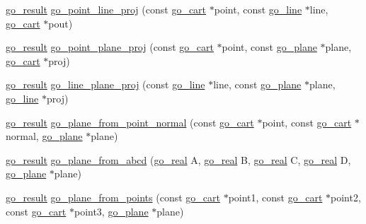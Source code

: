 \begin{DoxyCompactItemize}
\item 
\hyperlink{gotypes_8h_a55d48b38cd959f63c7e8db8337a9792a}{go\-\_\-result} \hyperlink{namespacegomotion_a36bd2c5167f64cc51da6bdf3dbdb4116}{go\-\_\-point\-\_\-line\-\_\-proj} (const \hyperlink{structgomotion_1_1go__cart}{go\-\_\-cart} $\ast$point, const \hyperlink{structgomotion_1_1go__line}{go\-\_\-line} $\ast$line, \hyperlink{structgomotion_1_1go__cart}{go\-\_\-cart} $\ast$pout)
\item 
\hyperlink{gotypes_8h_a55d48b38cd959f63c7e8db8337a9792a}{go\-\_\-result} \hyperlink{namespacegomotion_a79d749aa4142b2ee2e135f46a6656f21}{go\-\_\-point\-\_\-plane\-\_\-proj} (const \hyperlink{structgomotion_1_1go__cart}{go\-\_\-cart} $\ast$point, const \hyperlink{structgomotion_1_1go__plane}{go\-\_\-plane} $\ast$plane, \hyperlink{structgomotion_1_1go__cart}{go\-\_\-cart} $\ast$proj)
\item 
\hyperlink{gotypes_8h_a55d48b38cd959f63c7e8db8337a9792a}{go\-\_\-result} \hyperlink{namespacegomotion_a120a912e2b439a904744d980b62867aa}{go\-\_\-line\-\_\-plane\-\_\-proj} (const \hyperlink{structgomotion_1_1go__line}{go\-\_\-line} $\ast$line, const \hyperlink{structgomotion_1_1go__plane}{go\-\_\-plane} $\ast$plane, \hyperlink{structgomotion_1_1go__line}{go\-\_\-line} $\ast$proj)
\item 
\hyperlink{gotypes_8h_a55d48b38cd959f63c7e8db8337a9792a}{go\-\_\-result} \hyperlink{namespacegomotion_abffde2f69bd2e58d2b099558e892661e}{go\-\_\-plane\-\_\-from\-\_\-point\-\_\-normal} (const \hyperlink{structgomotion_1_1go__cart}{go\-\_\-cart} $\ast$point, const \hyperlink{structgomotion_1_1go__cart}{go\-\_\-cart} $\ast$normal, \hyperlink{structgomotion_1_1go__plane}{go\-\_\-plane} $\ast$plane)
\item 
\hyperlink{gotypes_8h_a55d48b38cd959f63c7e8db8337a9792a}{go\-\_\-result} \hyperlink{namespacegomotion_a62472d69cf3770531052efa51d42d139}{go\-\_\-plane\-\_\-from\-\_\-abcd} (\hyperlink{gotypes_8h_afd666a2393eebd71ee455846ac9def9b}{go\-\_\-real} A, \hyperlink{gotypes_8h_afd666a2393eebd71ee455846ac9def9b}{go\-\_\-real} B, \hyperlink{gotypes_8h_afd666a2393eebd71ee455846ac9def9b}{go\-\_\-real} C, \hyperlink{gotypes_8h_afd666a2393eebd71ee455846ac9def9b}{go\-\_\-real} D, \hyperlink{structgomotion_1_1go__plane}{go\-\_\-plane} $\ast$plane)
\item 
\hyperlink{gotypes_8h_a55d48b38cd959f63c7e8db8337a9792a}{go\-\_\-result} \hyperlink{namespacegomotion_aebc299a30f9b6bab3221df9381691a7a}{go\-\_\-plane\-\_\-from\-\_\-points} (const \hyperlink{structgomotion_1_1go__cart}{go\-\_\-cart} $\ast$point1, const \hyperlink{structgomotion_1_1go__cart}{go\-\_\-cart} $\ast$point2, const \hyperlink{structgomotion_1_1go__cart}{go\-\_\-cart} $\ast$point3, \hyperlink{structgomotion_1_1go__plane}{go\-\_\-plane} $\ast$plane)

\end{DoxyCompactItemize}
